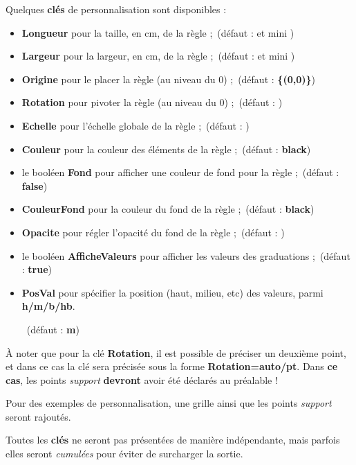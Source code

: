 \documentclass[french,a4paper,11pt]{article}
\newcommand\Cle[1]{{\bfseries\sffamily\textlangle #1\textrangle}}
\begin{document}
\begin{tipblock}
Quelques \Cle{clés} de personnalisation sont disponibles :

\begin{itemize}
	\item \Cle{Longueur} pour la taille, en cm, de la règle ;\hfill~(défaut : \Cle{12} et mini \Cle{3})
	\item \Cle{Largeur} pour la largeur, en cm, de la règle ;\hfill~(défaut : \Cle{1.5} et mini \Cle{1.25})
	\item \Cle{Origine} pour le placer la règle (au niveau du $0$) ;\hfill~(défaut : \Cle{\{(0,0)\}})
	\item \Cle{Rotation} pour pivoter la règle (au niveau du $0$) ;\hfill~(défaut : \Cle{0})
	\item \Cle{Echelle} pour l'échelle globale de la règle ;\hfill~(défaut : \Cle{1})
	\item \Cle{Couleur} pour la couleur des éléments de la règle ;\hfill~(défaut : \Cle{black})
	\item le booléen \Cle{Fond} pour afficher une couleur de fond pour la règle ;\hfill~(défaut : \Cle{false})
	\item \Cle{CouleurFond} pour la couleur du fond de la règle ;\hfill~(défaut : \Cle{black})
	\item \Cle{Opacite} pour régler l'opacité du fond de la règle ;\hfill~(défaut : \Cle{0.5})
	\item le booléen \Cle{AfficheValeurs} pour afficher les valeurs des graduations ;\hfill~(défaut : \Cle{true})
	\item \Cle{PosVal} pour spécifier la position (haut, milieu, etc) des valeurs, parmi \Cle{h/m/b/hb}.
	
	\hfill~(défaut : \Cle{m})
\end{itemize}

À noter que pour la clé \Cle{Rotation}, il est possible de préciser un deuxième point, et dans ce cas la clé sera précisée sous la forme \Cle{Rotation=auto/pt}. Dans \textbf{ce cas}, les points \textit{support} \textbf{devront} avoir été déclarés au préalable !
\end{tipblock}

\begin{noteblock}
Pour des exemples de personnalisation, une grille ainsi que les points \textit{support} seront rajoutés.

\smallskip

Toutes les \Cle{clés} ne seront pas présentées de manière indépendante, mais parfois elles seront \textit{cumulées} pour éviter de surcharger la sortie.
\end{noteblock}
\end{document}
